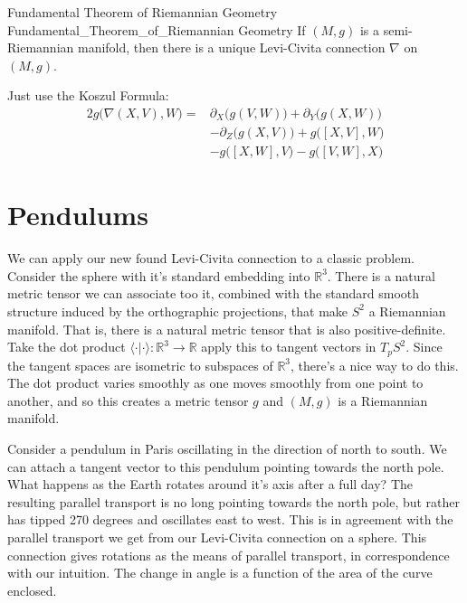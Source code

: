 \documentclass{article}                                                        %
\begin{document}
        \begin{ftheorem}{Fundamental Theorem of Riemannian Geometry}
                        {Fundamental_Theorem_of_Riemannian Geometry}
            If $(M,g)$ is a semi-Riemannian manifold, then there is a unique
            Levi-Civita connection $\nabla$ on $(M,g)$.
        \end{ftheorem}
        \begin{bproof}
            Just use the Koszul Formula:
            \begin{equation}
                \begin{split}
                    2g\big(\nabla(X,V),W)=&\partial_{X}\big(g(V,W)\big)+
                        \partial_{Y}\big(g(X,W)\big)\\
                        &-\partial_{Z}\big(g(X,V)\big)+g\big([X,V],W\big)\\
                        &-g\big([X,W],V\big)-g\big([V,W],X\big)
                \end{split}
            \end{equation}
        \end{bproof}
    \section{Pendulums}
        We can apply our new found Levi-Civita connection to a classic problem.
        Consider the sphere with it's standard embedding into $\mathbb{R}^{3}$.
        There is a natural metric tensor we can associate too it, combined with
        the standard smooth structure induced by the orthographic projections,
        that make $S^{2}$ a Riemannian manifold. That is, there is a natural
        metric tensor that is also positive-definite. Take the dot product
        $\langle\cdot|\cdot\rangle:\mathbb{R}^{3}\rightarrow\mathbb{R}$ apply
        this to tangent vectors in $T_{p}S^{2}$. Since the tangent spaces are
        isometric to subspaces of $\mathbb{R}^{3}$, there's a nice way to do
        this. The dot product varies smoothly as one moves smoothly from one
        point to another, and so this creates a metric tensor $g$ and
        $(M,g)$ is a Riemannian manifold.
        \par\hfill\par
        Consider a pendulum in Paris oscillating in the direction of north to
        south. We can attach a tangent vector to this pendulum pointing towards
        the north pole. What happens as the Earth rotates around it's axis after
        a full day? The resulting parallel transport is no long pointing towards
        the north pole, but rather has tipped 270 degrees and oscillates east
        to west. This is in agreement with the parallel transport we get from
        our Levi-Civita connection on a sphere. This connection gives rotations
        as the means of parallel transport, in correspondence with our
        intuition. The change in angle is a function of the area of the curve
        enclosed.
\end{document}

